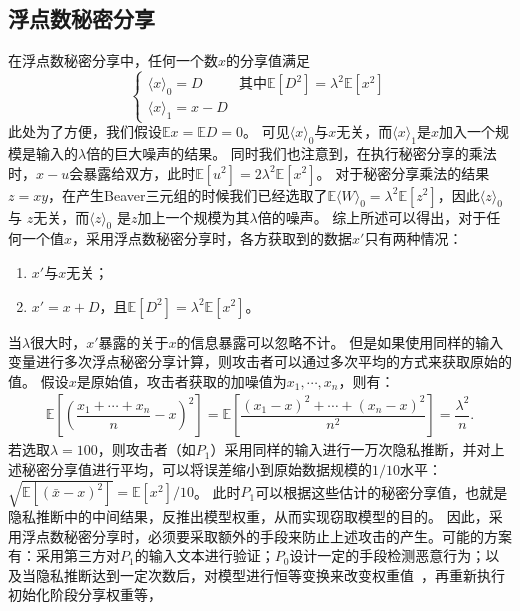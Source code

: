 \subsection{浮点数秘密分享}
在浮点数秘密分享中，任何一个数$x$的分享值满足
\begin{equation}
\begin{cases}
    \langle x \rangle_0 = D & \text{其中} \mathbb E[D^2] = \lambda^2 \mathbb E[x^2] \\
    \langle x \rangle_1 = x - D
\end{cases}
\end{equation}
此处为了方便，我们假设$\mathbb Ex = \mathbb ED = 0$。
%
可见$\langle x \rangle_0$与$x$无关，而$\langle x \rangle_1$是$x$加入一个规模是输入的$\lambda$倍的巨大噪声的结果。
%
同时我们也注意到，在执行秘密分享的乘法时，$x - u$会暴露给双方，此时$\mathbb E[u^2] = 2\lambda^2 \mathbb E[x^2]$。
%
对于秘密分享乘法的结果$z = xy$，在产生Beaver三元组的时候我们已经选取了$\mathbb E \langle W \rangle_0 = \lambda^2 \mathbb E[z^2]$，因此$\langle z \rangle_0$ 与 $z$无关，而$\langle z \rangle_0$ 是$z$加上一个规模为其$\lambda$倍的噪声。
%
综上所述可以得出，对于任何一个值$x$，采用浮点数秘密分享时，各方获取到的数据$x'$只有两种情况：
\begin{enumerate}
    \item $x'$与$x$无关；
    \item $x' = x + D$，且$\mathbb E[D^2] = \lambda^2 \mathbb E[x^2]$。
\end{enumerate}
%
当$\lambda$很大时，$x'$暴露的关于$x$的信息暴露可以忽略不计。
%
但是如果使用同样的输入变量进行多次浮点秘密分享计算，则攻击者可以通过多次平均的方式来获取原始的值。
%
假设$x$是原始值，攻击者获取的加噪值为$x_1, \cdots, x_n$，则有：
\begin{equation}
\begin{split}
    \mathbb E\left[\left(\dfrac{x_1 + \cdots + x_n}{n} - x \right)^2 \right] = 
    \mathbb E\left[\dfrac{(x_1 - x)^2 + \cdots + (x_n - x)^2}{n^2} \right] =
    \dfrac{\lambda^2}{n}.
\end{split}
\end{equation}
%
若选取$\lambda = 100$，则攻击者（如$P_1$）采用同样的输入进行一万次隐私推断，并对上述秘密分享值进行平均，可以将误差缩小到原始数据规模的$1/10$水平：
$\sqrt{\mathbb E[(\bar x - x)^2]} = {\mathbb E[x^2]}/{10}$。
%
此时$P_1$可以根据这些估计的秘密分享值，也就是隐私推断中的中间结果，反推出模型权重，从而实现窃取模型的目的。
%
因此，采用浮点数秘密分享时，必须要采取额外的手段来防止上述攻击的产生。可能的方案有：采用第三方对$P_1$的输入文本进行验证；$P_0$设计一定的手段检测恶意行为；以及当隐私推断达到一定次数后，对模型进行恒等变换来改变权重值~\cite{}，再重新执行初始化阶段分享权重等，
%


